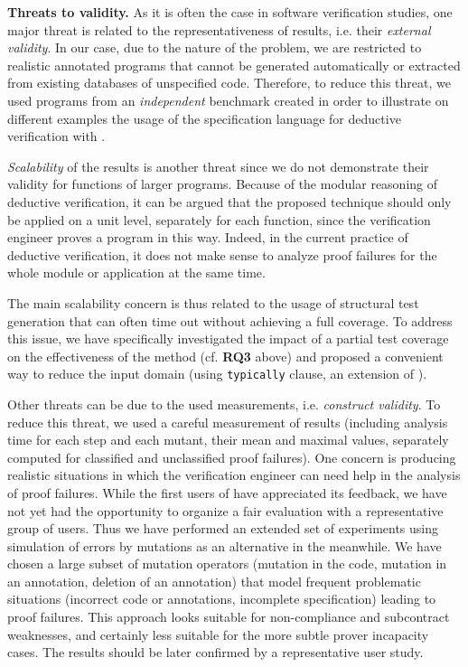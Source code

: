 \textbf{Threats to validity.}
As it is often the case in software verification studies, one major threat is
related to the 
representativeness of results, i.e. their \textit{external validity}.
In our case, due to the nature of the problem,
we are restricted to realistic annotated programs
that cannot be generated automatically 
or extracted from existing databases of unspecified code.
Therefore, to reduce this threat, we used programs from an \textit{independent}
benchmark \cite{ACSLbyExample} created in order to illustrate
on different examples the usage of the \acsl specification 
language for deductive verification with \framac.



\textit{Scalability} of the results is another threat
since we do not demonstrate their validity for functions of larger programs. 
Because of the modular reasoning of deductive verification,
it can be argued that the proposed technique should only be applied on a unit level,
separately for each function, since the verification engineer proves a program  in this way.
Indeed, in the current practice of deductive verification, it does not make sense to analyze
proof failures for the whole module or application at the same time.

The main scalability concern is thus related to the usage of structural test generation 
that can often time out without achieving a full coverage.
To address this issue, we have specifically investigated the impact of a partial test coverage
on the effectiveness of the method (cf. \textbf{RQ3} above) and proposed
a convenient way to reduce the input domain (using \lstinline{typically} clause, 
an extension of \acsl).

Other threats can be due to the used measurements, i.e. \textit{construct validity}.
To reduce this threat, we used a careful measurement of 
results (including analysis time for each step and 
each mutant, their mean and maximal values, 
separately computed for classified and unclassified proof failures).
One concern is producing realistic situations in which 
the verification engineer can need help in the analysis of proof failures.
While the first users of \stady have appreciated its feedback, %
we have not yet had the opportunity to organize a fair evaluation with a 
representative group of users. 
Thus we have performed an extended set of experiments using simulation of 
errors by mutations as an alternative in the meanwhile. 
We have chosen a large subset of mutation operators (mutation in the code,
mutation in an annotation, deletion of an annotation) that model 
frequent problematic situations 
(incorrect code or annotations, incomplete specification)
leading to proof failures.
This approach looks suitable for non-compliance and subcontract weaknesses, and
certainly less suitable for the more subtle prover incapacity cases.
The results should be later confirmed by a representative user study.


